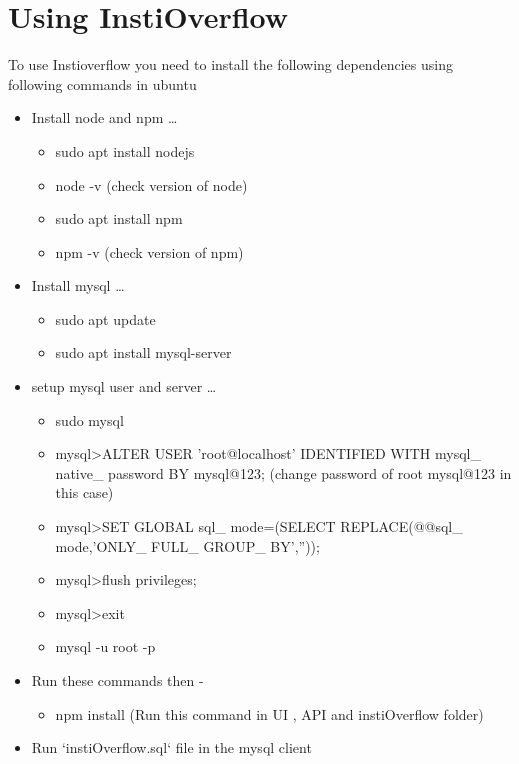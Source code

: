 \documentclass[12pt]{article}
\begin{document}
\section{Using InstiOverflow}
To use Instioverflow you need to install the following dependencies using following commands in ubuntu\\
\begin{itemize}


\item Install node and npm \dots{}
\begin{itemize}
	\item  sudo apt install nodejs
	\item  node -v   (check version of node)
	\item sudo apt install npm
	\item npm -v   (check version of npm)

\end{itemize}

\item Install mysql \dots{}
\begin{itemize}
	\item  sudo apt update
	\item  sudo apt install mysql-server
\end{itemize}

\item setup mysql user and server \dots{}
\begin{itemize}
	\item  sudo mysql
	\item  mysql>ALTER USER 'root@localhost' IDENTIFIED WITH mysql\_ native\_ password  BY mysql@123; (change password of root mysql@123 in this case)
	\item mysql>SET GLOBAL sql\_ mode=(SELECT REPLACE(@@sql\_ mode,'ONLY\_ FULL\_ GROUP\_ BY',''));
	\item mysql>flush privileges;
	\item mysql>exit
	\item mysql -u root -p

\end{itemize}
\item Run these commands then - 
\begin{itemize}


	\item npm install (Run this command in UI , API and instiOverflow folder)

\end{itemize}
	
	\item Run `instiOverflow.sql` file in the mysql client




\end{itemize}
\end{document}

